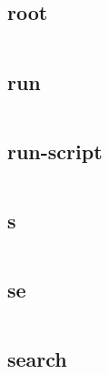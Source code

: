 \begin{lstlisting}[language=bash]

\end{lstlisting}

\subsection{root}


\begin{lstlisting}[language=bash]

\end{lstlisting}

\subsection{run}



\begin{lstlisting}[language=bash]

\end{lstlisting}

\subsection{run-script}


\begin{lstlisting}[language=bash]

\end{lstlisting}

\subsection{s}


\begin{lstlisting}[language=bash]

\end{lstlisting}


\subsection{se}


\begin{lstlisting}[language=bash]

\end{lstlisting}

\subsection{search}



